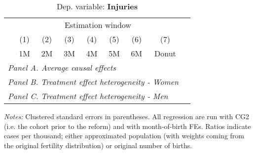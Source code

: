 \begin{table}[H] \begin{threeparttable} \centering \caption{Dep. variable: \textbf{Injuries}} {\def\sym#1{\ifmmode^{#1}\else\(^{#1}\)\fi} \begin{tabular}{l*{8}{c}} \toprule & \multicolumn{7}{c}{Estimation window} \\ \cmidrule(lr){2-8}
            &\multicolumn{1}{c}{(1)}&\multicolumn{1}{c}{(2)}&\multicolumn{1}{c}{(3)}&\multicolumn{1}{c}{(4)}&\multicolumn{1}{c}{(5)}&\multicolumn{1}{c}{(6)}&\multicolumn{1}{c}{(7)}\\
            &\multicolumn{1}{c}{1M}&\multicolumn{1}{c}{2M}&\multicolumn{1}{c}{3M}&\multicolumn{1}{c}{4M}&\multicolumn{1}{c}{5M}&\multicolumn{1}{c}{6M}&\multicolumn{1}{c}{Donut}\\
\midrule
 \multicolumn{8}{l}{\emph{Panel A. Average causal effects}} \\       \midrule\multicolumn{8}{l}{\emph{Panel B. Treatment effect heterogeneity - Women}} \\       \midrule\multicolumn{8}{l}{\emph{Panel C. Treatment effect heterogeneity - Men}} \\       
\bottomrule \end{tabular} } \begin{tablenotes} \item \scriptsize \emph{Notes:} Clustered standard errors in parentheses. All regression are run with CG2 (i.e. the cohort prior to the reform) and with month-of-birth FEs. Ratios indicate cases per thousand; either approximated population (with weights coming from the original fertility distribution) or original number of births. \end{tablenotes} \end{threeparttable} \end{table} 
